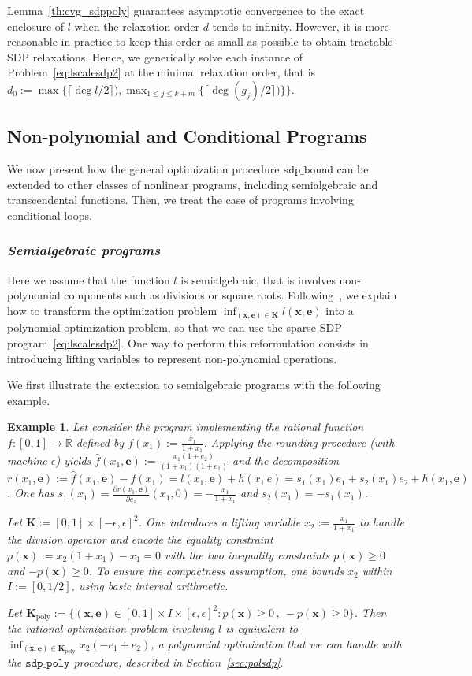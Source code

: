 \documentclass[preprint]{sigplanconf}
\newcommand{\R}{\mathbb{R}}
\newcommand{\x}{\mathbf{x}}
\newcommand{\e}{\mathbf{e}}
\def\K{\mathbf{K}}
\newcommand{\Kpol}{\K_{\text{poly}}}
\newcommand{\sdpbound}{\mathtt{sdp\_bound}}
\newcommand{\sdppoly}{\mathtt{sdp\_poly}}
\theoremstyle{plain}
\newtheorem{example}{Example}
\begin{document}
%
Lemma~\ref{th:cvg_sdppoly} guarantees asymptotic convergence to the exact enclosure of $l$ when the relaxation order $d$ tends to infinity. However, it is more reasonable in practice to keep this order as small as possible to obtain tractable SDP relaxations. Hence, we generically solve each instance of Problem~\eqref{eq:lscalesdp2} at the minimal relaxation order, that is $d_0 := \max \{\lceil \deg l / 2\rceil) , \max_{1 \leq j \leq k+m} \{ \lceil \deg (g_j) / 2\rceil) \} \}$. 
%
\subsection{Non-polynomial and Conditional Programs}
\label{sec:nonpolsdp}
We now present how the general optimization procedure $\sdpbound$ can be extended to other classes of nonlinear programs, including semialgebraic and transcendental functions. Then, we treat the case of programs involving conditional loops.
%
\subsubsection*{\textit{Semialgebraic programs}} 
Here we assume that the function $l$ is semialgebraic, that is involves non-polynomial components such as divisions or square roots.
Following~\cite{LasPut10}, we explain how to transform the optimization problem $\inf_{(\x,\e) \in \K} l (\x, \e)$ into a polynomial optimization problem, so that we can use the sparse SDP program~\eqref{eq:lscalesdp2}. One way to perform this reformulation consists in introducing lifting variables to represent non-polynomial operations.

We first illustrate the extension to semialgebraic programs with the following example.
\begin{example}
Let consider the program implementing the rational function $f : [0, 1] \to \R$ defined by $f(x_1) := \frac{x_1}{1 + x_1}$. Applying the rounding procedure (with machine $\epsilon$) yields $\hat{f}(x_1,\e) := \frac{x _1(1 + e_2)}{(1 + x_1)(1 + e_1)}$ and the decomposition $r(x_1, \e) := \hat{f}(x_1,\e) - f(x_1) = l(x_1,\e) + h(x_1\,e) = s_1 (x_1) e_1 + s_2 (x_1) e_2 + h(x_1,\e)$. One has $s_1(x_1) = \frac{\partial r(x_1,\e)} {\partial e_1} (x_1,0) = -\frac{x_1}{1 + x_1}$ and $s_2(x_1) = - s_1(x_1)$.

Let $\K := [0, 1] \times [-\epsilon, \epsilon]^2$. One introduces a lifting variable $x_2 := \frac{x_1}{1 + x_1}$ to handle the division operator and encode the equality constraint $p(\x) :=  x_2 (1 + x_1) - x_1 = 0$ with the two inequality constraints $p (\x) \geq 0$ and $-p(\x) \geq 0$. To ensure the compactness assumption, one bounds $x_2$ within $I := [0, 1/2]$, using basic interval arithmetic.

Let $\Kpol := \{(\x,\e) \in [0, 1] \times I \times [\epsilon, \epsilon]^2 : p(\x) \geq 0 \,,\  - p(\x) \geq 0 \}$. Then the rational optimization problem involving $l$ is equivalent to $\inf_{(\x,\e) \in \Kpol} x_2 (-e_1 + e_2)$, a polynomial optimization that we can handle with the $\sdppoly$ procedure, described in Section~\ref{sec:polsdp}.
\end{example}
%
\end{document}
